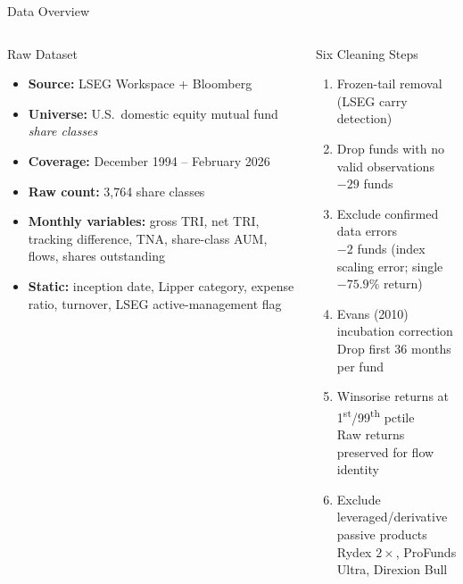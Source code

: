 \documentclass[aspectratio=169,10pt]{beamer}
\begin{document}
\begin{frame}{Data Overview}
\begin{columns}[T]
\begin{block}{Raw Dataset}
\begin{itemize}
  \item \textbf{Source:} LSEG Workspace + Bloomberg
  \item \textbf{Universe:} U.S.\ domestic equity mutual fund \emph{share classes}
  \item \textbf{Coverage:} December 1994 -- February 2026
  \item \textbf{Raw count:} 3,764 share classes
  \item \textbf{Monthly variables:} gross TRI, net TRI, tracking difference, TNA, share-class AUM, flows, shares outstanding
  \item \textbf{Static:} inception date, Lipper category, expense ratio, turnover, LSEG active-management flag
\end{itemize}
\end{block}

\begin{block}{Six Cleaning Steps}
\begin{enumerate}
  \setlength\itemsep{2pt}
  \item Frozen-tail removal (LSEG carry detection)
  \item Drop funds with no valid observations \\ {\footnotesize $-29$ funds}
  \item Exclude confirmed data errors \\ {\footnotesize $-2$ funds (index scaling error; single $-75.9\%$ return)}
  \item Evans (2010) incubation correction \\ {\footnotesize Drop first 36 months per fund}
  \item Winsorise returns at 1\textsuperscript{st}/99\textsuperscript{th} pctile \\ {\footnotesize Raw returns preserved for flow identity}
  \item Exclude leveraged/derivative passive products \\ {\footnotesize Rydex $2\times$, ProFunds Ultra, Direxion Bull}
\end{enumerate}
\end{block}
\end{columns}
\end{frame}
\end{document}
